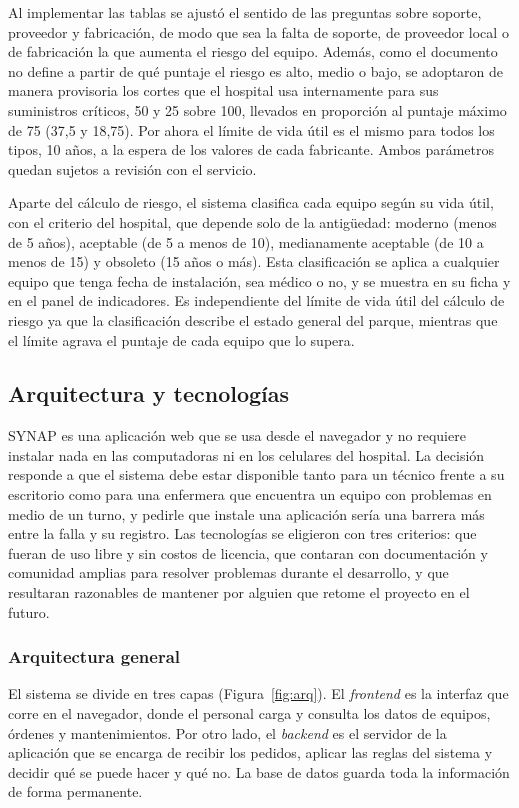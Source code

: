 \documentclass[10pt]{article}
\begin{document}
Al implementar las tablas se ajustó el sentido de las preguntas sobre soporte, proveedor y fabricación, de modo que sea la falta de soporte, de proveedor local o de fabricación la que aumenta el riesgo del equipo. Además, como el documento no define a partir de qué puntaje el riesgo es alto, medio o bajo, se adoptaron de manera provisoria los cortes que el hospital usa internamente para sus suministros críticos, 50 y 25 sobre 100, llevados en proporción al puntaje máximo de 75 (37,5 y 18,75). Por ahora el límite de vida útil es el mismo para todos los tipos, 10 años, a la espera de los valores de cada fabricante. Ambos parámetros quedan sujetos a revisión con el servicio.

Aparte del cálculo de riesgo, el sistema clasifica cada equipo según su vida útil, con el criterio del hospital, que depende solo de la antigüedad: moderno (menos de 5 años), aceptable (de 5 a menos de 10), medianamente aceptable (de 10 a menos de 15) y obsoleto (15 años o más). Esta clasificación se aplica a cualquier equipo que tenga fecha de instalación, sea médico o no, y se muestra en su ficha y en el panel de indicadores. Es independiente del límite de vida útil del cálculo de riesgo ya que la clasificación describe el estado general del parque, mientras que el límite agrava el puntaje de cada equipo que lo supera.

\subsection{Arquitectura y tecnologías}
\label{sec:arquitectura-tecnologias}
SYNAP es una aplicación web que se usa desde el navegador y no requiere instalar nada en las computadoras ni en los celulares del hospital. La decisión responde a que el sistema debe estar disponible tanto para un técnico frente a su escritorio como para una enfermera que encuentra un equipo con problemas en medio de un turno, y pedirle que instale una aplicación sería una barrera más entre la falla y su registro. Las tecnologías se eligieron con tres criterios: que fueran de uso libre y sin costos de licencia, que contaran con documentación y comunidad amplias para resolver problemas durante el desarrollo, y que resultaran razonables de mantener por alguien que retome el proyecto en el futuro. 

\subsubsection{Arquitectura general}
El sistema se divide en tres capas (Figura~\ref{fig:arq}). El \textit{frontend} es la interfaz que corre en el navegador, donde el personal carga y consulta los datos de equipos, órdenes y mantenimientos. Por otro lado, el \textit{backend} es el servidor de la aplicación que se encarga de recibir los pedidos, aplicar las reglas del sistema y decidir qué se puede hacer y qué no. La base de datos guarda toda la información de forma permanente.
\end{document}
